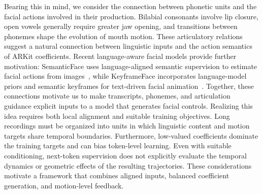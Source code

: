 Bearing this in mind, we consider the connection between phonetic units and the facial actions involved in their production.
Bilabial consonants involve lip closure, open vowels generally require greater jaw opening, and transitions between phonemes shape the evolution of mouth motion.
These articulatory relations suggest a natural connection between linguistic inputs and the action semantics of ARKit coefficients.
Recent language-aware facial models provide further motivation: SemanticFace uses language-aligned semantic supervision to estimate facial actions from images~\cite{kang2026semanticface}, while KeyframeFace incorporates language-model priors and semantic keyframes for text-driven facial animation~\cite{wu2025keyframeface}.
Together, these connections motivate us to make transcripts, phonemes, and articulation guidance explicit inputs to a model that generates facial controls. 
Realizing this idea requires both local alignment and suitable training objectives.
Long recordings must be organized into units in which linguistic content and motion targets share temporal boundaries.
Furthermore, low-valued coefficients dominate the training targets and can bias token-level learning.
Even with suitable conditioning, next-token supervision does not explicitly evaluate the temporal dynamics or geometric effects of the resulting trajectories.
These considerations motivate a framework that combines aligned inputs, balanced coefficient generation, and motion-level feedback.

